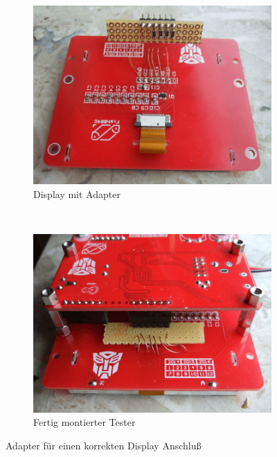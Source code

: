 \begin{figure}[H]
  \begin{subfigure}[b]{.5\textwidth}	%
    \centering
    \includegraphics[width=1.\textwidth]{../PNG/Fish8840Adapt1.jpg}	%
    \caption{Display mit Adapter}
  \end{subfigure}
~
  \begin{subfigure}[b]{.5\textwidth}	%
    \centering
    \includegraphics[width=1.\textwidth]{../PNG/Fish8840Adapt2.jpg}	%
    \caption{Fertig montierter Tester}
  \end{subfigure}
  \caption{Adapter für einen korrekten Display Anschluß}
\label{fig:Fish8840Adapt}
\end{figure}

